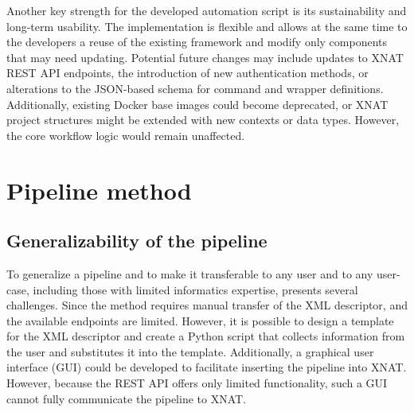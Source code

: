Another key strength for the developed automation script is its sustainability and long-term usability. The implementation is flexible and allows at the same time to the developers a reuse of the existing framework and modify only components that may need updating. Potential future changes may include updates to XNAT REST API endpoints, the introduction of new authentication methods, or alterations to the JSON-based schema for command and wrapper definitions. Additionally, existing Docker base images could become deprecated, or XNAT project structures might be extended with new contexts or data types. However, the core workflow logic would remain unaffected.

\section{Pipeline method}

\subsection{Generalizability of the pipeline}
\normalsize
To generalize a pipeline and to make it transferable to any user and to any user-case, including those with limited informatics expertise, presents several challenges.
Since the method requires manual transfer of the XML descriptor,  and the available endpoints are limited. 
However, it is possible to design a template for the XML descriptor and create a Python script that collects information from the user and substitutes it into the template. Additionally, a graphical user interface (GUI) could be developed to facilitate inserting the pipeline into XNAT. However, because the REST API offers only limited functionality, such a GUI cannot fully communicate the pipeline to XNAT.







